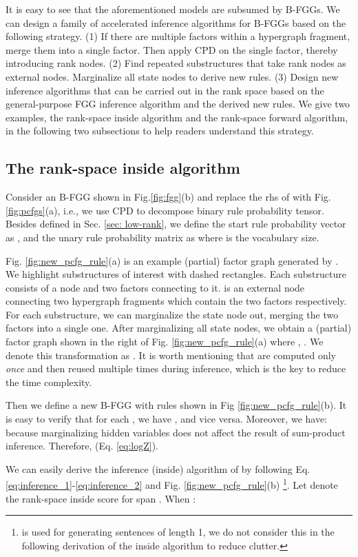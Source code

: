 \documentclass[11pt]{article}
\begin{document}
\smallskip
It is easy to see that the aforementioned models are subsumed by B-FGGs. We can design a family of accelerated inference algorithms for B-FGGs based on the following strategy. (1) If there are multiple factors within a hypergraph fragment, merge them into a single factor. Then apply CPD on the single factor, thereby introducing rank nodes. (2) Find repeated substructures that take rank nodes as external nodes.  Marginalize all state nodes to derive new rules. (3) Design new inference algorithms that can be carried out in the rank space based on the general-purpose FGG inference algorithm and the derived new rules. We give two examples, the rank-space inside algorithm and the rank-space forward algorithm, in the following two subsections to help readers understand this strategy.

\subsection{The rank-space inside algorithm}
\label{sec:rank-inside}
Consider an B-FGG  shown in Fig.\ref{fig:fgg}(b) and replace the rhs of  with Fig. \ref{fig:pcfgs}(a), i.e., we use CPD to decompose binary rule probability tensor. Besides  defined in Sec. \ref{sec: low-rank}, we define the start rule probability vector as , and the unary rule probability matrix as  where  is the vocabulary size.

Fig. \ref{fig:new_pcfg_rule}(a) is an example (partial) factor graph  generated by . We highlight substructures of interest with dashed rectangles. Each substructure consists of a node  and two factors connecting to it.  is an external node connecting two hypergraph fragments which contain the two factors respectively. For each substructure, we can marginalize the state 
node  out, merging the two factors into a single one. After marginalizing all state 
nodes, we obtain a (partial) factor graph  shown in the right of Fig. \ref{fig:new_pcfg_rule}(a) where , . We denote this transformation as . It is worth mentioning that  are computed only \emph{once} and then reused multiple times during inference, which is the key to reduce the time complexity. 

Then we define a new B-FGG  with rules shown in Fig \ref{fig:new_pcfg_rule}(b). It is easy to verify that for each , we have , and vice versa.  Moreover, we have:  
because marginalizing hidden variables does not affect the result of sum-product inference. Therefore,   (Eq. \ref{eq:logZ}).

We can easily derive the inference (inside) algorithm of  by following Eq. \ref{eq:inference_1}-\ref{eq:inference_2} and Fig. \ref{fig:new_pcfg_rule}(b) \footnote{ is used for generating sentences of length 1, we do not consider this in the following derivation of the inside algorithm to reduce clutter.}. Let  denote the rank-space inside score for span . When :
\end{document}
